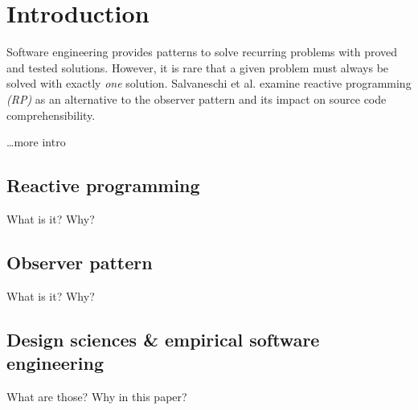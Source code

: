\documentclass[12pt,a4paper,twocolumn]{article}
\begin{document}

	\section{Introduction}
	Software engineering provides patterns to solve recurring problems with proved and tested solutions. However, it is rare that a given problem must always be solved with exactly \emph{one} solution. Salvaneschi et al. \cite{7827078} examine reactive programming \emph{(RP)} as an alternative to the observer pattern \cite{gamma1995design} and its impact on source code comprehensibility.

	\dots{more intro}

	\subsection{Reactive programming}
	What is it? Why?

	\subsection{Observer pattern}
	What is it? Why?

	\subsection{Design sciences \& empirical software engineering}
	What are those? Why in this paper?
\end{document}
